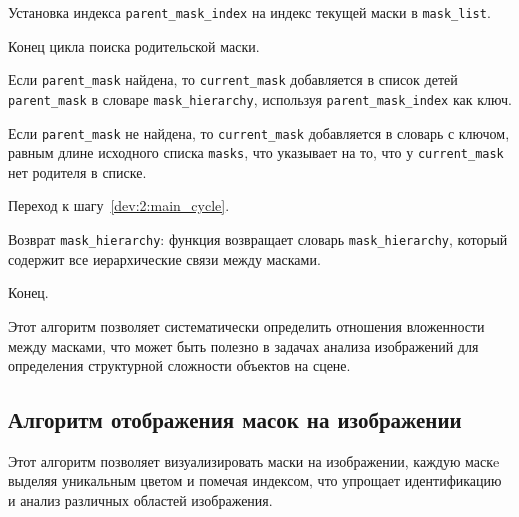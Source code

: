 \begin{enumerate_step}
    \item Установка индекса \lstinline{parent_mask_index} на индекс текущей маски в \lstinline{mask_list}.
    \item Конец цикла поиска родительской маски.
    \item Если \lstinline{parent_mask} найдена, то \lstinline{current_mask} добавляется в список детей \lstinline{parent_mask} в словаре \lstinline{mask_hierarchy}, используя \lstinline{parent_mask_index} как ключ.
    \item Если \lstinline{parent_mask} не найдена, то \lstinline{current_mask} добавляется в словарь с ключом, равным длине исходного списка \lstinline{masks}, что указывает на то, что у \lstinline{current_mask} нет родителя в списке.
    \item Переход к шагу~\ref{dev:2:main_cycle}.
    \item \label{dev:2:end} Возврат \lstinline{mask_hierarchy}: функция возвращает словарь \lstinline{mask_hierarchy}, который содержит все иерархические связи между масками.
    \item Конец.
\end{enumerate_step}

Этот алгоритм позволяет систематически определить отношения вложенности между масками, что может быть полезно в задачах анализа изображений для определения структурной сложности объектов на сцене.

\subsection{Алгоритм отображения масок на изображении}

Этот алгоритм позволяет визуализировать маски на изображении, каждую маскe выделяя уникальным цветом и помечая индексом, что упрощает идентификацию и анализ различных областей изображения.

